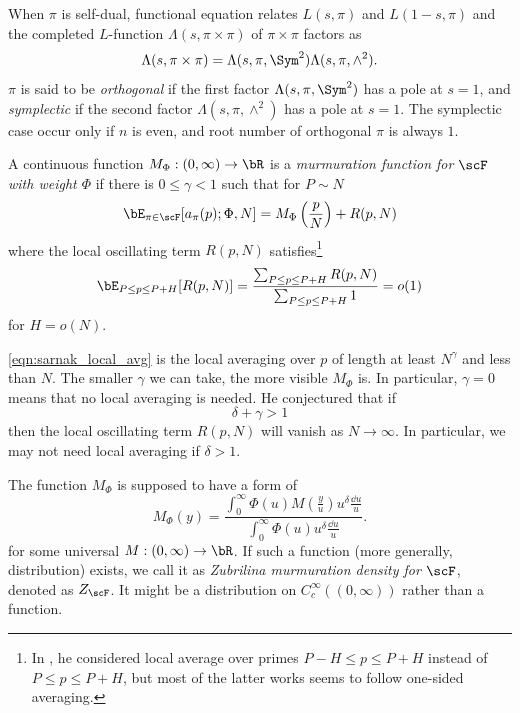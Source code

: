 When $\pi$ is self-dual, functional equation relates $L(s, \pi)$ and $L(1-s, \pi)$ and the completed $L$-function $\Lambda(s, \pi \times \pi)$ of $\pi \times \pi$ factors as
\[
\Lambda(s, \pi \times \pi) = \Lambda(s, \pi, \Sym^2) \Lambda(s, \pi, \wedge^2).
\]
$\pi$ is said to be \emph{orthogonal} if the first factor $\Lambda(s, \pi, \Sym^2)$ has a pole at $s = 1$, and \emph{symplectic} if the second factor $\Lambda(s, \pi, \wedge^2)$ has a pole at $s = 1$.
The symplectic case occur only if $n$ is even, and root number of orthogonal $\pi$ is always $1$.


\begin{definition}
A continuous function $M_\Phi : (0, \infty) \to \bR$ is a \emph{murmuration function for $\scF$ with weight $\Phi$} if there is $0 \le \gamma < 1$ such that for $P \sim N$
\begin{equation}
    \label{eqn:sarnak_murmuration}
    \bE_{\pi \in \scF} [a_\pi(p);\Phi, N] = M_\Phi\left(\frac{p}{N}\right) + R(p, N)
\end{equation}
where the local oscillating term $R(p, N)$ satisfies\footnote{In \cite{sarnak}, he considered local average over primes $P-H \le p \le P + H$ instead of $P \le p \le P + H$, but most of the latter works seems to follow one-sided averaging.}
\begin{equation}
    \label{eqn:sarnak_local_avg}
    \bE_{P \le p \le P + H} [R(p, N)] = \frac{\sum_{P \le p \le P + H} R(p, N)}{\sum_{P \le p \le P + H} 1} = o(1)
\end{equation}
for $H = o(N)$.
\end{definition}
\eqref{eqn:sarnak_local_avg} is the local averaging over $p$ of length at least $N^\gamma$ and less than $N$.
The smaller $\gamma$ we can take, the more visible $M_\Phi$ is.
In particular, $\gamma = 0$ means that no local averaging is needed.
He conjectured that if
\begin{equation}
    \label{eqn:sarnak_local_thres}
    \delta + \gamma > 1
\end{equation}
then the local oscillating term $R(p, N)$ will vanish as $N \to \infty$.
In particular, we may not need local averaging if $\delta > 1$.

The function $M_\Phi$ is supposed to have a form of
\begin{equation}
    \label{eqn:sarnak_zubrilina_density}
    M_\Phi(y) = \frac{\int_0^{\infty} \Phi(u) M\left(\frac{y}{u}\right) u^\delta \frac{\dd u}{u}}{\int_0^{\infty} \Phi(u) u^\delta \frac{\dd u}{u}}.
\end{equation}
for some universal $M : (0, \infty) \to \bR$.
If such a function (more generally, distribution) exists, we call it as \emph{Zubrilina murmuration density for $\scF$}, denoted as $Z_{\scF}$.
It might be a distribution on $C_c^\infty((0, \infty))$ rather than a function.



